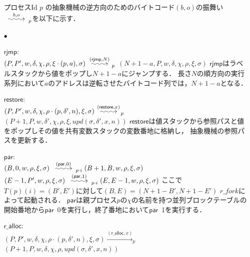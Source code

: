 \documentclass[submit,PRO]{ipsj}
\makeatletter
\newcommand{\longsquiggly}{\xymatrix{{}\ar@{~>}[r]&{}}}
\newcommand{\bcode}[1]{$\mathsf{#1}$}
\newcommand{\brightarrow}[1]{\stackrel{#1}{\longsquiggly}}
\makeatother
\begin{document}
プロセスId $p$ の抽象機械の逆方向のためのバイトコード$(b,o)$の振舞い
$\brightarrow{b,o}_{p}$を以下に示す．

\begin{list}%
 {$\bullet$} %
 {} %
 \item \bcode{rjmp}:\\
$(P,P',w,\delta,\chi,\rho,\xi\cdot(p,a),\sigma)\brightarrow{(\mathsf{rjmp},N)}_p$\newline
\qquad$(N+1-a,P,w,\delta,\chi,\rho,\xi,\sigma)$\newline
\bcode{rjmp}はラベルスタックから値をポップし$N+1-a$にジャンプする．
長さ$N$の順方向の実行系列において$a$のアドレスは逆転させたバイトコード列では，$N+1-a$となる．
\item \bcode{restore}:\\
$(P,P',w,\delta,\chi,\rho\cdot(p,\delta',n),\xi,\sigma)\brightarrow{(\mathsf{restore},x)}_p$\newline
\qquad$(P+1,P,w,\delta',\chi,\rho,\xi,upd(\sigma,\delta',x,n))$\newline
\bcode{restore}は値スタックから参照パスと値をポップしその値を共有変数スタックの変数番地に格納し，
抽象機械の参照パスを更新する．
\item \bcode{par}:\\
$(B,0,w,\rho,\xi,\sigma)\brightarrow{(\mathsf{par},0)}_{p\cdot i}(B+1,B,w,\rho,\xi,\sigma)$\newline
$(E-1,P',w,\rho,\xi,\sigma)\brightarrow{(\mathsf{par},1)}_{p\cdot i}(E,E-1,w,\rho,\xi,\sigma)$\newline
ここで$T(p)(i)=(B',E')$に対して$(B,E)=(N+1-B',N+1-E')$ $r\_fork$によって起動される．
\bcode{par}は親プロセス$p$の$\chi$の名前を持つ並列ブロックテーブルの開始番地から\bcode{par}\ 0を実行し，終了番地において\bcode{par}\ 1を実行する．
\item \bcode{r\_alloc}:\\\relax
$(P,P',w,\delta,\chi,\rho\cdot(p,\delta',n),\xi,\sigma)\xrightarrow{(\mathsf{r\_alloc},x)}_p$\newline
\qquad $(P+1,P,w,\delta,\chi,\rho,upd(\sigma,\delta',x,n))$\newline

\end{list}
\end{document}
